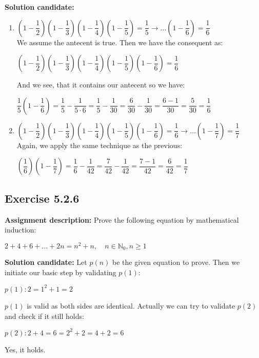 \documentclass{report}
\newcommand{\cent}[1]{\begin{center}#1\end{center}}
\newcommand{\doubleN}{\mathbb{N}}
\newcommand{\In}{\! \in \!}
\newcommand{\AssignmentDescription}{\textbf{Assignment description: }}
\newcommand{\Solution}{\textbf{Solution candidate: }}
\newcommand{\QED}{\boxed{}}
\newcommand{\Exercise}[1]{\subsection{Exercise #1}}
\newcommand{\defaultEnumerateLabel}{\textbf{\alph*.}}
\newcommand{\MyItem}[1]{\item #1\\}
\newcommand{\parenthesis}[1]{\left( #1 \right)}
\begin{document}
 	\Solution
 	\begin{enumerate}[label=\defaultEnumerateLabel]
 		\MyItem{$\parenthesis{1 - \dfrac{1}{2}}\parenthesis{1 - \dfrac{1}{3}}\parenthesis{1 - \dfrac{1}{4}}\parenthesis{1 - \dfrac{1}{5}} = \dfrac{1}{5} \to \dots \parenthesis{1 - \dfrac{1}{6}} = \dfrac{1}{6} $}
 		
 		We assume the antecent is true. Then we have the consequent as:
 		
 		\cent{$\parenthesis{1 - \dfrac{1}{2}}\parenthesis{1 - \dfrac{1}{3}}\parenthesis{1 - \dfrac{1}{4}}\parenthesis{1 - \dfrac{1}{5}}\parenthesis{1 - \dfrac{1}{6}} = \dfrac{1}{6}$}
 		
 		And we see, that it contains our antecent so we have: 
 		
 		\cent{$\dfrac{1}{5}\parenthesis{1 - \dfrac{1}{6}} =\dfrac{1}{5} - \dfrac{1}{5 \cdot 6} = \dfrac{1}{5} - \dfrac{1}{30} = \dfrac{6}{30} - \dfrac{1}{30} = \dfrac{6-1}{30} = \dfrac{5}{30} = \dfrac{1}{6}$}
 		
 		\QED
 		
 		\MyItem{$\parenthesis{1 - \dfrac{1}{2}}\parenthesis{1 - \dfrac{1}{3}}\parenthesis{1 - \dfrac{1}{4}}\parenthesis{1 - \dfrac{1}{5}}\parenthesis{1 - \dfrac{1}{6}} = \dfrac{1}{6} \to \dots \parenthesis{1 - \dfrac{1}{7}} = \dfrac{1}{7} $}
 		
 		Again, we apply the same technique as the previous:
 		
 		\cent{$\parenthesis{\dfrac{1}{6}}\parenthesis{1 - \dfrac{1}{7}} = \dfrac{1}{6} - \dfrac{1}{42} = \dfrac{7}{42} - \dfrac{1}{42} = \dfrac{7-1}{42} = \dfrac{6}{42} = \dfrac{1}{7}$}
 		
 	\end{enumerate}
 	
 	\Exercise{5.2.6}
 	
 	\AssignmentDescription
 	Prove the following equation by mathematical induction:
 	
 	\cent{$2+4+6+\dots +2n = n^2 + n, \quad n \In \doubleN_0, n \geq 1$}
 	
 	\Solution
	Let $p(n)$ be the given equation to prove. Then we initiate our basic step by validating $p(1)$:
	
	\cent{$p(1) : 2 = 1^2 + 1 = 2$}
	
	$p(1)$ is valid as both sides are identical. Actually we can try to validate $p(2)$ and check if it still holds:
	
	\cent{$p(2) : 2 + 4 = 6 =2^2 + 2 = 4+2 = 6$}
	
	Yes, it holds.\\
	
\end{document}
